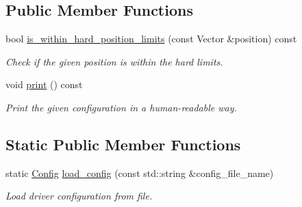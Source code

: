 \subsection*{Public Member Functions}
\begin{DoxyCompactItemize}
\item 
bool \hyperlink{structblmc__robots_1_1NJointBlmcRobotDriver_1_1Config_ae34fb8f28bdec0401b72b09bc8d48b65}{is\+\_\+within\+\_\+hard\+\_\+position\+\_\+limits} (const Vector \&position) const
\begin{DoxyCompactList}\small\item\em Check if the given position is within the hard limits. \end{DoxyCompactList}\item 
\mbox{\label{structblmc__robots_1_1NJointBlmcRobotDriver_1_1Config_a1181ecfd861240c97131f644fa354726}} 
void \hyperlink{structblmc__robots_1_1NJointBlmcRobotDriver_1_1Config_a1181ecfd861240c97131f644fa354726}{print} () const
\begin{DoxyCompactList}\small\item\em Print the given configuration in a human-\/readable way. \end{DoxyCompactList}\end{DoxyCompactItemize}
\subsection*{Static Public Member Functions}
\begin{DoxyCompactItemize}
\item 
static \hyperlink{structblmc__robots_1_1NJointBlmcRobotDriver_1_1Config}{Config} \hyperlink{structblmc__robots_1_1NJointBlmcRobotDriver_1_1Config_acd73ca574eacb067ee6a29c6a4a2704a}{load\+\_\+config} (const std\+::string \&config\+\_\+file\+\_\+name)
\begin{DoxyCompactList}\small\item\em Load driver configuration from file. \end{DoxyCompactList}\end{DoxyCompactItemize}
